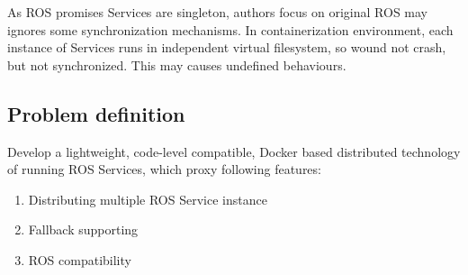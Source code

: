 As ROS promises Services are singleton, authors focus on original ROS may ignores some
synchronization mechanisms.
In containerization environment, each instance of Services runs in independent virtual
filesystem, so wound not crash, but not synchronized. This may causes undefined behaviours.

\subsection{Problem definition}

Develop a lightweight, code-level compatible, Docker based distributed technology of
running ROS Services, which proxy following features:

\begin{enumerate}
    \item Distributing multiple ROS Service instance \label{feature:mul}
    \item Fallback supporting \label{feature:fallback}
    \item ROS compatibility \label{feature:comp}
\end{enumerate}


